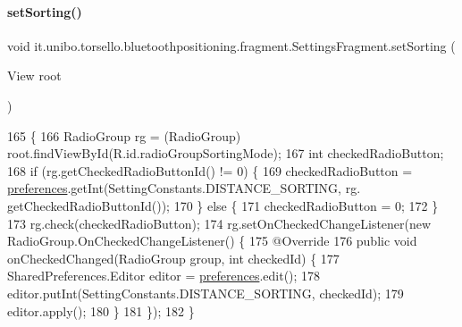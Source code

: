 \hypertarget{classit_1_1unibo_1_1torsello_1_1bluetoothpositioning_1_1fragment_1_1SettingsFragment_ae29f0b3d6fc60f1ceeab5dcc530166c1_ae29f0b3d6fc60f1ceeab5dcc530166c1}{}\label{classit_1_1unibo_1_1torsello_1_1bluetoothpositioning_1_1fragment_1_1SettingsFragment_ae29f0b3d6fc60f1ceeab5dcc530166c1_ae29f0b3d6fc60f1ceeab5dcc530166c1} 
\paragraph{\texorpdfstring{set\+Sorting()}{setSorting()}}
{\footnotesize\ttfamily void it.\+unibo.\+torsello.\+bluetoothpositioning.\+fragment.\+Settings\+Fragment.\+set\+Sorting (\begin{DoxyParamCaption}\item[{View}]{root }\end{DoxyParamCaption})\hspace{0.3cm}{\ttfamily [private]}}


\begin{DoxyCode}
165                                        \{
166         RadioGroup rg = (RadioGroup) root.findViewById(R.id.radioGroupSortingMode);
167         \textcolor{keywordtype}{int} checkedRadioButton;
168         \textcolor{keywordflow}{if} (rg.getCheckedRadioButtonId() != 0) \{
169             checkedRadioButton = \hyperlink{classit_1_1unibo_1_1torsello_1_1bluetoothpositioning_1_1fragment_1_1SettingsFragment_a52480c4d5d81ca59fe4a98ae3c623ea4_a52480c4d5d81ca59fe4a98ae3c623ea4}{preferences}.getInt(SettingConstants.DISTANCE\_SORTING, rg.
      getCheckedRadioButtonId());
170         \} \textcolor{keywordflow}{else} \{
171             checkedRadioButton = 0;
172         \}
173         rg.check(checkedRadioButton);
174         rg.setOnCheckedChangeListener(\textcolor{keyword}{new} RadioGroup.OnCheckedChangeListener() \{
175             @Override
176             \textcolor{keyword}{public} \textcolor{keywordtype}{void} onCheckedChanged(RadioGroup group, \textcolor{keywordtype}{int} checkedId) \{
177                 SharedPreferences.Editor editor = \hyperlink{classit_1_1unibo_1_1torsello_1_1bluetoothpositioning_1_1fragment_1_1SettingsFragment_a52480c4d5d81ca59fe4a98ae3c623ea4_a52480c4d5d81ca59fe4a98ae3c623ea4}{preferences}.edit();
178                 editor.putInt(SettingConstants.DISTANCE\_SORTING, checkedId);
179                 editor.apply();
180             \}
181         \});
182     \}
\end{DoxyCode}


